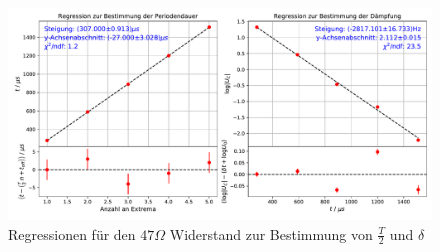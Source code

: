 \documentclass[a4paper, 12pt]{scrartcl}
\begin{document}
\begin{figure}[H]
\centering
\includegraphics[width=\textwidth]{plots/reg_schwingung5.pdf}
\caption{Regressionen für den $47\Omega$ Widerstand zur Bestimmung von $\frac{T}{2}$ und $\delta$}
\end{figure}
\end{document}
